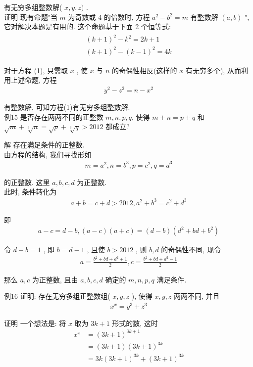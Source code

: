 有无穷多组整数解( $x, y, z)$ . \\
证明 现有命题"当 $m$ 为奇数或 4 的倍数时, 方程 $a^{2}-b^{2}=m$ 有整数解 $(a, b)$ ", 它对解决本题是有用的. 这个命题基于下面 2 个恒等式:
\begin{align*}
	\begin{gathered}
		(k+1)^{2}-k^{2}=2 k+1 \\
		(k+1)^{2}-(k-1)^{2}=4 k
	\end{gathered}
\end{align*}

对于方程 (1), 只需取 $x$ , 使 $x$ 与 $n$ 的奇偶性相反(这样的 $x$ 有无穷多个), 从而利用上述命题, 方程
\begin{align*}
	y^{2}-z^{2}=n-x^{2}
\end{align*}

有整数解, 可知方程(1)有无穷多组整数解. \\
例15 是否存在两两不同的正整数 $m ,  n ,  p ,  q$, 使得 $m+n=p+q$ 和 $\sqrt{m}+\sqrt[3]{n}=\sqrt{p}+\sqrt[3]{q}>2012$ 都成立?

解 存在满足条件的正整数. \\
由方程的结构, 我们寻找形如
\begin{align*}
	m=a^{2}, n=b^{3}, p=c^{2}, q=d^{3}
\end{align*}

的正整数. 这里 $a ,  b ,  c ,  d$ 为正整数. \\
此时, 条件转化为
\begin{align*}
	a+b=c+d>2012, a^{2}+b^{3}=c^{2}+d^{3}
\end{align*}

即
\begin{align*}
	a-c=d-b,(a-c)(a+c)=(d-b)\left(d^{2}+b d+b^{2}\right)
\end{align*}

令 $d-b=1$ , 即 $b=d-1$ , 且使 $b>2012$ , 则 $b ,  d$ 的奇偶性不同, 现令
\begin{align*}
	a=\frac{b^{2}+b d+d^{2}+1}{2}, c=\frac{b^{2}+b d+d^{2}-1}{2}
\end{align*}

那么 $a ,  c$ 为正整数, 且由 $a ,  b ,  c ,  d$ 确定的 $m ,  n ,  p ,  q$ 满足条件.

例16 证明: 存在无穷多组正整数组( $x, y, z$ ), 使得 $x, y, z$ 两两不同, 并且
\begin{align*}
	x^{x}=y^{3}+z^{3}
\end{align*}

证明 一个想法是: 将 $x$ 取为 $3 k+1$ 形式的数, 这时\begin{align}
	x^{x} & =(3 k+1)^{3 k+1}                \\
	      & =(3 k+1)(3 k+1)^{3 k}           \\
	      & =3 k(3 k+1)^{3 k}+(3 k+1)^{3 k}
\end{align}

